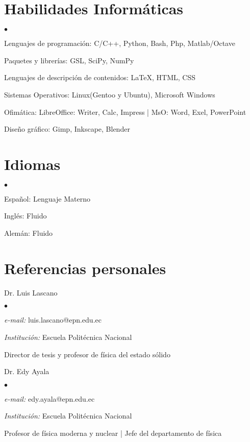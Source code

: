 \documentclass[margin,line]{res}
\newenvironment{list1}{
  \begin{list}{\ding{113}}{%
      \setlength{\itemsep}{0in}
      \setlength{\parsep}{0in} \setlength{\parskip}{0in}
      \setlength{\topsep}{0in} \setlength{\partopsep}{0in} 
      \setlength{\leftmargin}{0.17in}}}{\end{list}}
\newenvironment{list2}{
  \begin{list}{$\bullet$}{%
      \setlength{\itemsep}{0in}
      \setlength{\parsep}{0in} \setlength{\parskip}{0in}
      \setlength{\topsep}{0in} \setlength{\partopsep}{0in} 
      \setlength{\leftmargin}{0.2in}}}{\end{list}}
\begin{document}
\begin{resume}
\section{\sc Habilidades Informáticas}
  \begin{list2}
    \item Lenguajes de programación:  C/C++, Python, Bash, Php, Matlab/Octave
    \item Paquetes y librerías: GSL, SciPy, NumPy
    \item Lenguajes de descripción de contenidos: \LaTeX, HTML, CSS
    \item Sistemas Operativos: Linux(Gentoo y Ubuntu), Microsoft Windows
    \item Ofimática: LibreOffice: Writer, Calc, Impress | MsO: Word, Exel, PowerPoint
    \item Diseño gráfico: Gimp, Inkscape, Blender
  \end{list2}

\section{\sc Idiomas}
  \begin{list2}
    \item Español: Lenguaje Materno
    \item Inglés: Fluido
    \item Alemán: Fluido
  \end{list2}
  
\section{\sc Referencias personales}
 \begin{list1}
  \item[] Dr. Luis Lascano
  \begin{list2}
   \item {\it e-mail:} luis.lascano@epn.edu.ec
   \item {\it Institución:} Escuela Politécnica Nacional
   \item Director de tesis y profesor de física del estado sólido
  \end{list2}
 \end{list1}

 \begin{list1}
  \item[] Dr. Edy Ayala
  \begin{list2}
   \item {\it e-mail:} edy.ayala@epn.edu.ec
   \item {\it Institución:} Escuela Politécnica Nacional
   \item Profesor de física moderna y nuclear | Jefe del departamento de física
  \end{list2}
 \end{list1}
 

\end{resume}
\end{document}
